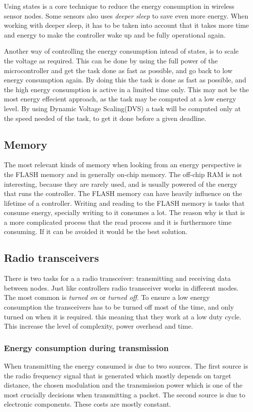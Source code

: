 Using states is a core technique to reduce the energy consumption in wireless sensor nodes. Some sensors also uses \emph{deeper sleep} to save even more energy. When working with deeper sleep, it has to be taken into account that it takes more time and energy to make the controller wake up and be fully operational again.

Another way of controlling the energy consumption intead of states, is to scale the voltage as required. This can be done by using the full power of the microcontroller and get the task done as fast as possible, and go back to low energy consumption again. By doing this the task is done as fast as possible, and the high energy consumption is active in a limited time only. This may not be the most energy effecient approach, as the task may be computed at a low energy level. By using Dynamic Voltage Scaling(DVS) a task will be computed only at the speed needed of the task, to get it done before a given deadline.

\subsection{Memory}
The most relevant kinds of memory when looking from an energy perspective is the FLASH memory and in generally on-chip memory. The off-chip RAM is not interesting, because they are rarely used, and is usually powered of the energy that runs the controller.
The FLASH memory can have heavily influence on the lifetime of a controller. Writing and reading to the FLASH memory is tasks that consume energy, specially writing to it consumes a lot. The reason why is that is a more complicated process that the read process and it is furthermore time consuming.
If it can be avoided it would be the best solution.  
 
\subsection{Radio transceivers}
  
There is two tasks for a a radio transceiver: transmitting and receiving data between nodes. Just like controllers radio transceiver works in different modes. The most common is \emph{turned on} or \emph{turned off}. To ensure a low energy consumption the transceivers has to be turned off most of the time, and only turned on when it is required. this meaning that they work at a low duty cycle.
This increase the level of complexity, power overhead and time. 
  
\subsubsection*{Energy consumption during transmission}
When transmitting the energy consumed is due to two sources. The first source is the radio frequency signal that is generated which mostly depends on target distance, the chosen modulation and the transmission power which is one of the most crucially decisions when transmitting a packet. The second source is due to electronic components. These costs are mostly constant.


